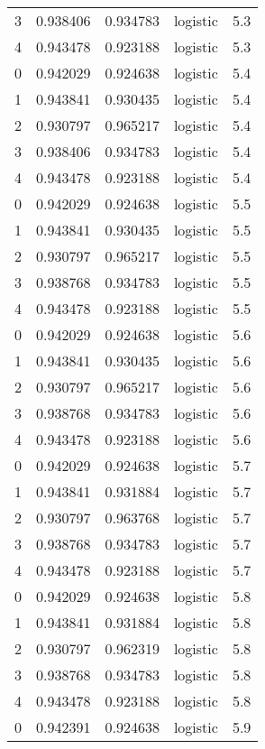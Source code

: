 \begin{tabular}{rrrlr}
     3 & 0.938406 & 0.934783 & logistic &        5.3 \\
     4 & 0.943478 & 0.923188 & logistic &        5.3 \\
     0 & 0.942029 & 0.924638 & logistic &        5.4 \\
     1 & 0.943841 & 0.930435 & logistic &        5.4 \\
     2 & 0.930797 & 0.965217 & logistic &        5.4 \\
     3 & 0.938406 & 0.934783 & logistic &        5.4 \\
     4 & 0.943478 & 0.923188 & logistic &        5.4 \\
     0 & 0.942029 & 0.924638 & logistic &        5.5 \\
     1 & 0.943841 & 0.930435 & logistic &        5.5 \\
     2 & 0.930797 & 0.965217 & logistic &        5.5 \\
     3 & 0.938768 & 0.934783 & logistic &        5.5 \\
     4 & 0.943478 & 0.923188 & logistic &        5.5 \\
     0 & 0.942029 & 0.924638 & logistic &        5.6 \\
     1 & 0.943841 & 0.930435 & logistic &        5.6 \\
     2 & 0.930797 & 0.965217 & logistic &        5.6 \\
     3 & 0.938768 & 0.934783 & logistic &        5.6 \\
     4 & 0.943478 & 0.923188 & logistic &        5.6 \\
     0 & 0.942029 & 0.924638 & logistic &        5.7 \\
     1 & 0.943841 & 0.931884 & logistic &        5.7 \\
     2 & 0.930797 & 0.963768 & logistic &        5.7 \\
     3 & 0.938768 & 0.934783 & logistic &        5.7 \\
     4 & 0.943478 & 0.923188 & logistic &        5.7 \\
     0 & 0.942029 & 0.924638 & logistic &        5.8 \\
     1 & 0.943841 & 0.931884 & logistic &        5.8 \\
     2 & 0.930797 & 0.962319 & logistic &        5.8 \\
     3 & 0.938768 & 0.934783 & logistic &        5.8 \\
     4 & 0.943478 & 0.923188 & logistic &        5.8 \\
     0 & 0.942391 & 0.924638 & logistic &        5.9 \\

\end{tabular}
